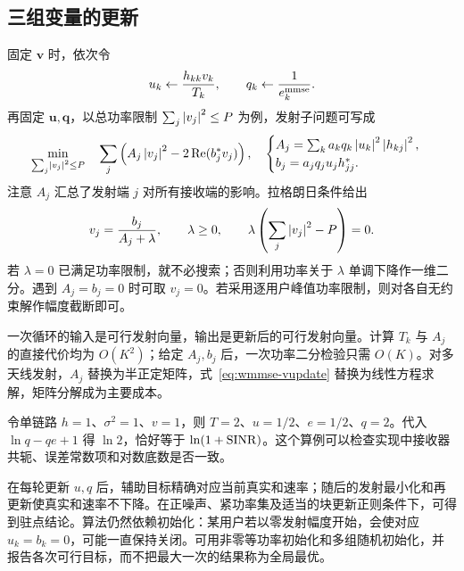 \subsection{三组变量的更新}

固定 $\bm v$ 时，依次令
\begin{equation}
 u_k\leftarrow\frac{h_{kk}v_k}{T_k},\qquad
 q_k\leftarrow\frac{1}{e_k^{\rm mmse}}.
 \label{eq:wmmse-uq}
\end{equation}
再固定 $\bm u,\bm q$，以总功率限制 $\sum_j\left\lvert v_j\right\rvert^2\leq P$ 为例，发射子问题可写成
\begin{equation}
 \min_{\sum_j\left\lvert v_j\right\rvert^2\leq P}\quad
 \sum_j\left(A_j\left\lvert v_j\right\rvert^2-2\operatorname{Re}(b_j^*v_j)\right),
 \quad
 \begin{cases}
 A_j=\sum_k a_kq_k\left\lvert u_k\right\rvert^2\left\lvert h_{kj}\right\rvert^2,\\
 b_j=a_jq_ju_jh_{jj}^*.
 \end{cases}
 \label{eq:wmmse-vsub}
\end{equation}
注意 $A_j$ 汇总了发射端 $j$ 对所有接收端的影响。拉格朗日条件给出
\begin{equation}
 v_j=\frac{b_j}{A_j+\lambda},\qquad
 \lambda\geq0,\qquad
 \lambda\left(\sum_j\left\lvert v_j\right\rvert^2-P\right)=0.
 \label{eq:wmmse-vupdate}
\end{equation}
若 $\lambda=0$ 已满足功率限制，就不必搜索；否则利用功率关于 $\lambda$ 单调下降作一维二分。遇到 $A_j=b_j=0$ 时可取 $v_j=0$。若采用逐用户峰值功率限制，则对各自无约束解作幅度截断即可。

一次循环的输入是可行发射向量，输出是更新后的可行发射向量。计算 $T_k$ 与 $A_j$ 的直接代价均为 $O(K^2)$；给定 $A_j,b_j$ 后，一次功率二分检验只需 $O(K)$。对多天线发射，$A_j$ 替换为半正定矩阵，式~\eqref{eq:wmmse-vupdate} 替换为线性方程求解，矩阵分解成为主要成本。

\begin{example}[没有干扰时的恒等式核对]
令单链路 $h=1$、$\sigma^2=1$、$v=1$，则 $T=2$、$u=1/2$、$e=1/2$、$q=2$。代入 $\ln q-qe+1$ 得 $\ln2$，恰好等于 $\ln(1+\operatorname{SINR})$。这个算例可以检查实现中接收器共轭、误差常数项和对数底数是否一致。
\end{example}

在每轮更新 $u,q$ 后，辅助目标精确对应当前真实和速率；随后的发射最小化和再更新使真实和速率不下降。在正噪声、紧功率集及适当的块更新正则条件下，可得到驻点结论\cite{shi2011,razaviyayn2013}。算法仍然依赖初始化：某用户若以零发射幅度开始，会使对应 $u_k=b_k=0$，可能一直保持关闭。可用非零等功率初始化和多组随机初始化，并报告各次可行目标，而不把最大一次的结果称为全局最优。

